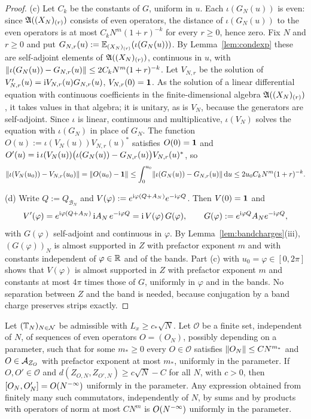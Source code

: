 \begin{proof}
(c) Let $C_k$ be the constants of $G$, uniform in $u$. Each $\iota(G_N(u))$ is even: since $\mathfrak{A}((X_N)_{(r)})$
consists of even operators, the distance of $\iota(G_N(u))$ to the even operators is at most $C_kN^m(1+r)^{-k}$ for
every $r\ge0$, hence zero. Fix $N$ and $r\ge0$ and put $G_{N,r}(u):=\mathbb{E}_{(X_N)_{(r)}}(\iota(G_N(u)))$. By Lemma~\ref{lem:condexp} these are
self-adjoint elements of $\mathfrak{A}((X_N)_{(r)})$, continuous in $u$, with
$\lVert\iota(G_N(u))-G_{N,r}(u)\rVert\le2C_kN^m(1+r)^{-k}$. Let $V_{N,r}$ be the solution of
$V_{N,r}'(u)=\mathrm{i} V_{N,r}(u)G_{N,r}(u)$, $V_{N,r}(0)=\mathbf{1}$. As the solution of a linear differential equation with continuous
coefficients in the finite-dimensional algebra $\mathfrak{A}((X_N)_{(r)})$, it takes values in that algebra; it is unitary,
as is $V_N$, because the generators are self-adjoint. Since $\iota$ is linear, continuous and multiplicative,
$\iota(V_N)$ solves the equation with $\iota(G_N)$ in place of $G_N$. The function $O(u):=\iota(V_N(u))V_{N,r}(u)^*$
satisfies $O(0)=\mathbf{1}$ and $O'(u)=\mathrm{i}\,\iota(V_N(u))\bigl(\iota(G_N(u))-G_{N,r}(u)\bigr)V_{N,r}(u)^*$, so
\[
\lVert\iota(V_N(u_0))-V_{N,r}(u_0)\rVert=\lVert O(u_0)-\mathbf{1}\rVert\le\int_0^{u_0}\lVert\iota(G_N(u))-G_{N,r}(u)\rVert\,\mathrm{d} u\le2u_0C_kN^m(1+r)^{-k}.
\]

(d) Write $Q:=Q_{\mathcal B_N}$ and $V(\varphi):=e^{\mathrm{i}\varphi(Q+A_N)}e^{-\mathrm{i}\varphi Q}$. Then $V(0)=\mathbf{1}$ and
\[
V'(\varphi)=e^{\mathrm{i}\varphi(Q+A_N)}\,\mathrm{i} A_N\,e^{-\mathrm{i}\varphi Q}=\mathrm{i}\,V(\varphi)\,G(\varphi),\qquad G(\varphi):=e^{\mathrm{i}\varphi Q}A_Ne^{-\mathrm{i}\varphi Q},
\]
with $G(\varphi)$ self-adjoint and continuous in $\varphi$. By Lemma~\ref{lem:bandcharges}(iii), $(G(\varphi))_N$ is
almost supported in $Z$ with prefactor exponent $m$ and with constants independent of $\varphi\in\mathbb{R}$ and of the bands.
Part (c) with $u_0=\varphi\in[0,2\pi]$ shows that $V(\varphi)$ is almost supported in $Z$ with prefactor exponent $m$
and constants at most $4\pi$ times those of $G$, uniformly in $\varphi$ and in the bands. No separation between $Z$
and the band is needed, because conjugation by a band charge preserves strips exactly.
\end{proof}

\begin{lemma}[bookkeeping]\label{lem:bookkeeping}
Let $(\mathbb{T}_N)_{N\in\mathcal N}$ be admissible with $L_x\ge c_*\sqrt N$. Let $\mathcal O$ be a finite set, independent of
$N$, of sequences of even operators $O=(O_N)$, possibly depending on a parameter, such that for
some $m_*\ge0$ every $O\in\mathcal O$ satisfies $\lVert O_N\rVert\le CN^{m_*}$ and $O\in\mathcal{A}_{Z_O}$ with prefactor exponent at
most $m_*$, uniformly in the parameter. If $O,O'\in\mathcal O$ and $d(Z_{O,N},Z_{O',N})\ge c\sqrt N-C$ for all $N$, with
$c>0$, then $[O_N,O'_N]=O(N^{-\infty})$ uniformly in the parameter. Any expression obtained from finitely many such
commutators, independently of $N$, by sums and by products with operators of norm at most $CN^m$ is $O(N^{-\infty})$
uniformly in the parameter.
\end{lemma}

